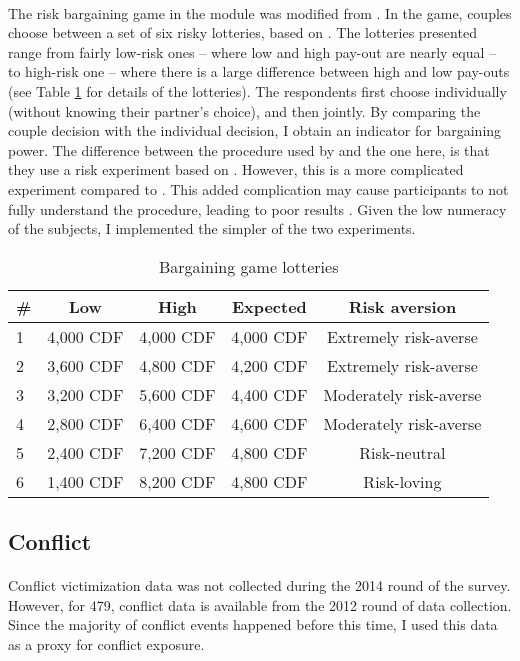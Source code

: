 \documentclass[11pt,a4paper]{scrartcl} %
\begin{document}
 \paragraph{}
 The risk bargaining game in the module was modified from \cite{Martinsson2009}. In the game, couples choose between a set of six risky lotteries, based on \cite{Eckel2002}. The lotteries presented range from fairly low-risk ones -- where low and high pay-out are nearly equal -- to high-risk one -- where there is a large difference between high and low pay-outs (see Table \ref{tab:bargaining} for details of the lotteries). The respondents first choose individually (without knowing their partner's choice), and then jointly. By comparing the couple decision with the individual decision, I obtain an indicator for bargaining power. The difference between the procedure used by \cite{Martinsson2009} and the one here, is that they use a risk experiment based on \cite{Holt2002}. However, this is a more complicated experiment compared to \citeauthor{Eckel2002}. This added complication may cause participants to not fully understand the procedure, leading to poor results \citep{Dave2010a}. Given the low numeracy of the subjects, I implemented the simpler of the two experiments.

\begin{table}
	\centering
	\caption{Bargaining game lotteries}
	\label{tab:bargaining}
	\begin{tabular}{l c c c c}
	\toprule
	\# & Low & High & Expected & Risk aversion \\
	\hline
	1 & 4,000 CDF & 4,000 CDF & 4,000 CDF & Extremely risk-averse \\
	2 & 3,600 CDF & 4,800 CDF & 4,200 CDF & Extremely risk-averse \\
	3 & 3,200 CDF & 5,600 CDF & 4,400 CDF & Moderately risk-averse \\
	4 & 2,800 CDF & 6,400 CDF & 4,600 CDF & Moderately risk-averse \\
	5 & 2,400 CDF & 7,200 CDF & 4,800 CDF & Risk-neutral \\
	6 & 1,400 CDF & 8,200 CDF & 4,800 CDF & Risk-loving \\ 
	\bottomrule
	\end{tabular}
\end{table}

\subsection*{Conflict}
\paragraph{}
Conflict victimization data was not collected during the 2014 round of the survey. However, for 479, conflict data is available from the 2012 round of data collection. Since the majority of conflict events happened before this time, I used this data as a proxy for conflict exposure.
\end{document}
